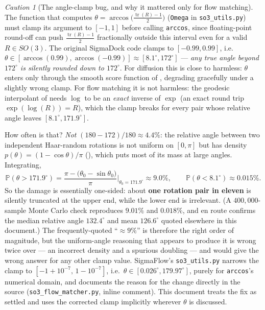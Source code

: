\documentclass[11pt,a4paper]{report}
\theoremstyle{definition}
\theoremstyle{remark}
\newtheorem{caution}[caution]{Caution}
\DeclareMathOperator{\tr}{tr}
\newcommand{\PP}{\mathbb P}
\newcommand{\file}[1]{\texttt{#1}}
\newcommand{\pyfunc}[1]{\texttt{#1}}
\begin{document}
\begin{caution}[The angle-clamp bug, and why it mattered only for flow matching]
\label{caution:omega-clamp}
The function that computes $\theta=\arccos\bigl(\tfrac{\tr(R)-1}2\bigr)$
(\pyfunc{Omega} in \file{so3\_utils.py}) must clamp its argument to
$[-1,1]$ before calling \pyfunc{arccos}, since floating-point round-off can
push $\tfrac{\tr(R)-1}2$ fractionally outside this interval even for a
valid $R\in SO(3)$. The original SigmaDock code clamps to
$[-0.99,0.99]$, i.e.\ $\theta\in[\arccos(0.99),\arccos(-0.99)]\approx[8.1^\circ,172^\circ]$
--- \emph{any true angle beyond $172^\circ$ is silently rounded down to
$172^\circ$}. For diffusion this is close to harmless: $\theta$ enters only
through the smooth score function of , degrading
gracefully under a slightly wrong clamp. For flow matching it is not
harmless: the geodesic interpolant of  needs
$\log$ to be an \emph{exact} inverse of $\exp$ (an exact round trip
$\exp(\log(R))=R$), which the clamp breaks for every pair whose relative
angle leaves $[8.1^\circ,171.9^\circ]$.

How often is that? \emph{Not} $(180-172)/180\approx4.4\%$: the relative angle
between two independent Haar-random rotations is not uniform on $[0,\pi]$ but
has density $p(\theta)=(1-\cos\theta)/\pi$ (), which puts
most of its mass at large angles. Integrating,
\[
\PP(\theta>171.9^\circ)=\frac{\pi-\bigl(\theta_0-\sin\theta_0\bigr)}{\pi}\bigg|_{\theta_0=171.9^\circ}
\approx 9.0\%,
\qquad
\PP(\theta<8.1^\circ)\approx 0.015\% .
\]
So the damage is essentially one-sided: about \textbf{one rotation pair in
eleven} is silently truncated at the upper end, while the lower end is
irrelevant. (A $400{,}000$-sample Monte Carlo check reproduces $9.01\%$ and
$0.018\%$, and en route confirms the median relative angle $132.4^\circ$ and
mean $126.6^\circ$ quoted elsewhere in this document.) The frequently-quoted
``$\approx9\%$'' is therefore the right order of magnitude, but the
uniform-angle reasoning that appears to produce it is wrong twice over --- an
incorrect density and a spurious doubling --- and would give the wrong answer
for any other clamp value.
SigmaFlow's \file{so3\_utils.py} narrows the clamp to
$[-1+10^{-7},\,1-10^{-7}]$, i.e.\ $\theta\in[0.026^\circ,179.97^\circ]$,
purely for \pyfunc{arccos}'s numerical domain, and documents the reason for
the change directly in the source (\file{so3\_flow\_matcher.py}, inline
comment). This document treats the fix as settled and uses the corrected
clamp implicitly wherever $\theta$ is discussed.
\end{caution}
\end{document}
